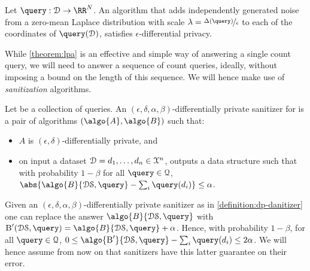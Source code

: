 		\begin{theorem}\label{theorem:lpa}
			Let $\query : \database \to \RR^\domainSize$.
			An algorithm  that adds independently generated noise from a zero-mean Laplace distribution with scale $\lambda = \nicefrac{\Delta(\query)}{\epsilon}$ to each of the \domainSize{} coordinates of $\query(\database)$, satisfies $\epsilon$-differential privacy.
		\end{theorem}

		While \cref{theorem:lpa} is an effective and simple way of answering a single count query, we will need to answer a sequence of count queries, ideally, without imposing a bound on the length of this sequence.
		We will hence make use of \emph{sanitization} algorithms.

		\begin{definition}\label{definition:dp-danitizer}
			Let \querySet{} be a collection of queries.
			An $(\epsilon, \delta, \alpha, \beta)$-differentially private sanitizer for \querySet{} is a pair of algorithms $(\algo{A}, \algo{B})$ such that:
			\begin{itemize}
				\item $A$ is $(\epsilon, \delta)$-differentially private, and
				\item on input a dataset $\mathcal{D} = d_1, \ldots, d_{n} \in \mathcal{X}^{n}$,  outputs a data structure \serverDS{} such that with probability $1 - \beta$ for all $\query \in \querySet$, $\abs{ \algo{B}{ \serverDS, \query } - \sum_i \query(d_i) } \leq \alpha$.
			\end{itemize}
		\end{definition}

		\begin{remark}\label{remark:dp-sanitizer-guarantees}
			Given an $(\epsilon, \delta, \alpha, \beta)$-differentially private sanitizer as in \cref{definition:dp-danitizer} one can replace the answer $\algo{B}{ \serverDS, \query }$ with $\textsc{B}^\prime ( \serverDS, \allowbreak \query ) = \algo{B}{ \serverDS, \query } + \alpha$.
			Hence, with probability $1 - \beta$, for all $\query \in \querySet$, $0 \leq \algo{\ensuremath{\textsc{B}^\prime}}{ \serverDS, \query } - \sum_i \query(d_i) \leq 2 \alpha$.
			We will hence assume from now on that sanitizers have this latter guarantee on their error.
		\end{remark}

